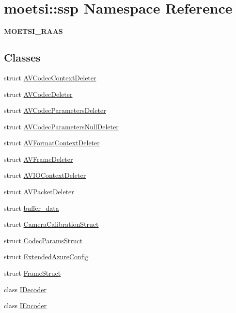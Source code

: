 \hypertarget{namespacemoetsi_1_1ssp}{}\section{moetsi\+:\+:ssp Namespace Reference}
\label{namespacemoetsi_1_1ssp}


{\bfseries M\+O\+E\+T\+S\+I\+\_\+\+R\+A\+AS}  


\subsection*{Classes}
\begin{DoxyCompactItemize}
\item 
struct \hyperlink{structmoetsi_1_1ssp_1_1AVCodecContextDeleter}{A\+V\+Codec\+Context\+Deleter}
\item 
struct \hyperlink{structmoetsi_1_1ssp_1_1AVCodecDeleter}{A\+V\+Codec\+Deleter}
\item 
struct \hyperlink{structmoetsi_1_1ssp_1_1AVCodecParametersDeleter}{A\+V\+Codec\+Parameters\+Deleter}
\item 
struct \hyperlink{structmoetsi_1_1ssp_1_1AVCodecParametersNullDeleter}{A\+V\+Codec\+Parameters\+Null\+Deleter}
\item 
struct \hyperlink{structmoetsi_1_1ssp_1_1AVFormatContextDeleter}{A\+V\+Format\+Context\+Deleter}
\item 
struct \hyperlink{structmoetsi_1_1ssp_1_1AVFrameDeleter}{A\+V\+Frame\+Deleter}
\item 
struct \hyperlink{structmoetsi_1_1ssp_1_1AVIOContextDeleter}{A\+V\+I\+O\+Context\+Deleter}
\item 
struct \hyperlink{structmoetsi_1_1ssp_1_1AVPacketDeleter}{A\+V\+Packet\+Deleter}
\item 
struct \hyperlink{structmoetsi_1_1ssp_1_1buffer__data}{buffer\+\_\+data}
\item 
struct \hyperlink{structmoetsi_1_1ssp_1_1CameraCalibrationStruct}{Camera\+Calibration\+Struct}
\item 
struct \hyperlink{structmoetsi_1_1ssp_1_1CodecParamsStruct}{Codec\+Params\+Struct}
\item 
struct \hyperlink{structmoetsi_1_1ssp_1_1ExtendedAzureConfig}{Extended\+Azure\+Config}
\item 
struct \hyperlink{structmoetsi_1_1ssp_1_1FrameStruct}{Frame\+Struct}
\item 
class \hyperlink{classmoetsi_1_1ssp_1_1IDecoder}{I\+Decoder}
\item 
class \hyperlink{classmoetsi_1_1ssp_1_1IEncoder}{I\+Encoder}

\end{DoxyCompactItemize}

